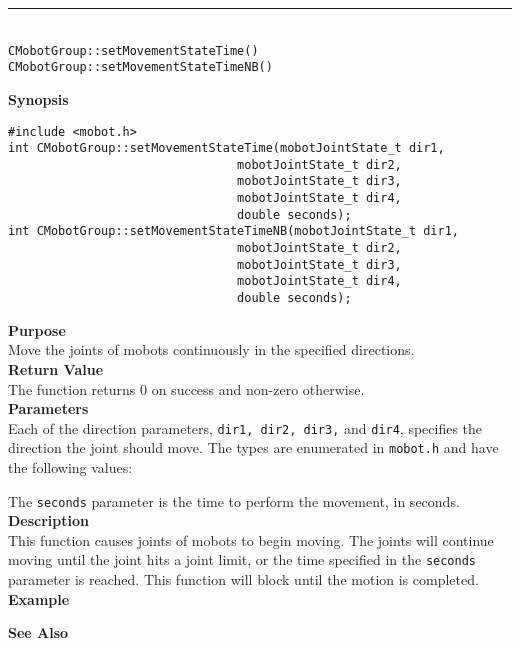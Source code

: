 \noindent
\vspace{5pt}
\rule{4.5in}{0.015in}\\
\noindent
{\LARGE \texttt{CMobotGroup::setMovementStateTime()}}\\
{\LARGE \texttt{CMobotGroup::setMovementStateTimeNB()}}\\
{}

\noindent
{\bf Synopsis}
\vspace{-8pt}
\begin{verbatim}
#include <mobot.h>
int CMobotGroup::setMovementStateTime(mobotJointState_t dir1, 
                                mobotJointState_t dir2, 
                                mobotJointState_t dir3, 
                                mobotJointState_t dir4, 
                                double seconds);
int CMobotGroup::setMovementStateTimeNB(mobotJointState_t dir1, 
                                mobotJointState_t dir2, 
                                mobotJointState_t dir3, 
                                mobotJointState_t dir4, 
                                double seconds);
\end{verbatim}

\noindent
{\bf Purpose}\\
Move the joints of mobots continuously in the specified directions.\\

\noindent
{\bf Return Value}\\
The function returns 0 on success and non-zero otherwise.\\

\noindent
{\bf Parameters}\\
Each of the direction parameters, \texttt{dir1, dir2, dir3,} and \texttt{dir4}, specifies the direction the joint should move. The types
are enumerated in \texttt{mobot.h} and have the following values:

The \texttt{seconds} parameter is the time to perform the movement, in seconds.
\\

\noindent
{\bf Description}\\
This function causes joints of mobots to begin moving. The joints will continue moving
until the joint hits a joint limit, or the time specified in the \texttt{seconds} parameter
is reached. This function will block until the motion is completed.\\

\noindent
{\bf Example}\\
\noindent

\noindent
{\bf See Also}\\

